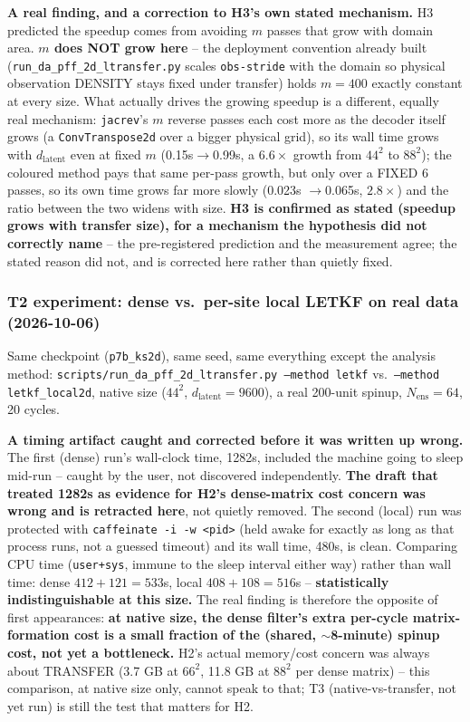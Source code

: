 \documentclass[11pt]{article}
\begin{document}
\textbf{A real finding, and a correction to H3's own stated mechanism.}
H3 predicted the speedup comes from avoiding $m$ passes that grow with
domain area. \textbf{$m$ does NOT grow here} -- the deployment
convention already built (\texttt{run\_da\_pff\_2d\_ltransfer.py} scales
\texttt{obs-stride} with the domain so physical observation DENSITY
stays fixed under transfer) holds $m=400$ exactly constant at every
size. What actually drives the growing speedup is a different, equally
real mechanism: \texttt{jacrev}'s $m$ reverse passes each cost more as
the decoder itself grows (a \texttt{ConvTranspose2d} over a bigger
physical grid), so its wall time grows with $d_{\mathrm{latent}}$ even
at fixed $m$ (0.15s$\to$0.99s, a $6.6\times$ growth from $44^2$ to
$88^2$); the coloured method pays that same per-pass growth, but only
over a FIXED 6 passes, so its own time grows far more slowly (0.023s
$\to$0.065s, $2.8\times$) and the ratio between the two widens with
size. \textbf{H3 is confirmed as stated (speedup grows with transfer
size), for a mechanism the hypothesis did not correctly name} -- the
pre-registered prediction and the measurement agree; the stated reason
did not, and is corrected here rather than quietly fixed.

\subsubsection*{T2 experiment: dense vs.\ per-site local LETKF on real data (2026-10-06)}
Same checkpoint (\texttt{p7b\_ks2d}), same seed, same everything except
the analysis method: \texttt{scripts/run\_da\_pff\_2d\_ltransfer.py
--method letkf} vs.\ \texttt{--method letkf\_local2d}, native size
($44^2$, $d_{\mathrm{latent}}{=}9600$), a real 200-unit spinup,
$N_{\mathrm{ens}}{=}64$, 20 cycles.

\textbf{A timing artifact caught and corrected before it was written up
wrong.} The first (dense) run's wall-clock time, 1282s, included the
machine going to sleep mid-run -- caught by the user, not discovered
independently. \textbf{The draft that treated 1282s as evidence for
H2's dense-matrix cost concern was wrong and is retracted here}, not
quietly removed. The second (local) run was protected with
\texttt{caffeinate -i -w <pid>} (held awake for exactly as long as that
process runs, not a guessed timeout) and its wall time, 480s, is clean.
Comparing CPU time (\texttt{user+sys}, immune to the sleep interval
either way) rather than wall time: dense $412{+}121{=}533$s, local
$408{+}108{=}516$s -- \textbf{statistically indistinguishable at this
size.} The real finding is therefore the opposite of first appearances:
\textbf{at native size, the dense filter's extra per-cycle
matrix-formation cost is a small fraction of the (shared, $\sim$8-minute)
spinup cost, not yet a bottleneck.} H2's actual memory/cost concern was
always about TRANSFER (3.7 GB at $66^2$, 11.8 GB at $88^2$ per dense
matrix) -- this comparison, at native size only, cannot speak to that;
T3 (native-vs-transfer, not yet run) is still the test that matters for
H2.
\end{document}
